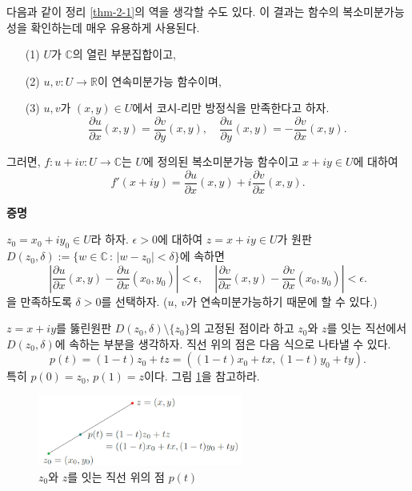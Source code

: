다음과 같이 정리 \ref{thm-2-1}의 역을 생각할 수도 있다.
이 결과는 함수의 복소미분가능성을 확인하는데 매우 유용하게 사용된다.

\par\smallskip
\par\smallskip
\par\smallskip

\begin{salttheorem}{}{} \label{thm-2-2}

\begin{itemize}
\item[(1)] $U$가 $\mathbb C$의 열린 부분집합이고,
\item[(2)] $u,v: U\to \mathbb R$이 연속미분가능 함수이며,
\item[(3)] $u,v$가 $(x,y)\in U$에서 코시-리만 방정식을 만족한다고 하자.
$$
\dfrac{\partial u}{\partial x}(x, y) = \dfrac{\partial v}{\partial y}(x, y),
\quad
\dfrac{\partial u}{\partial y}(x, y) = - \dfrac{\partial v}{\partial x}(x, y).
$$
\end{itemize}
그러면, $f:u+iv: U\to \mathbb C$는 $U$에 정의된 복소미분가능 함수이고
$x+iy\in U$에 대하여
$$
f'(x+iy) = \dfrac{\partial u}{\partial x}(x, y) + i \dfrac{\partial v}{\partial x}(x, y).
$$
\end{salttheorem}

{\bf 증명}

$z_0 = x_0 + iy_0 \in U$라 하자.
$\epsilon>0$에 대하여 
$z=x+iy\in U$가 원판 $D(z_0,\delta) := \{ w \in\mathbb C \,:\, |w-z_0| < \delta \}$에
속하면
\begin{equation}\label{eq-2-7}
\left| \dfrac{\partial u}{\partial x}(x,y) - \dfrac{\partial u}{\partial x}(x_0,y_0) \right| < \epsilon,
\quad
\left| \dfrac{\partial v}{\partial x}(x,y) - \dfrac{\partial v}{\partial x}(x_0,y_0) \right| < \epsilon.
\end{equation}
을 만족하도록 $\delta>0$를 선택하자.
($u$, $v$가 연속미분가능하기 때문에 할 수 있다.)

$z=x+iy$를 뚫린원판 $D(z_0,\delta)\setminus\{ z_0\}$의 고정된 점이라 하고
$z_0$와 $z$를 잇는 직선에서 $D(z_0,\delta)$에 속하는 부분을 생각하자.
직선 위의 점은 다음 식으로 나타낼 수 있다.
\[
p(t) = (1-t)z_0 + tz = \left( (1-t)x_0+tx, (1-t)y_0+ty \right).
\]
특히 $p(0)=z_0$, $p(1)=z$이다. 그림 \ref{fig-2-7}을 참고하라.

\begin{figure}[!h]
\begin{center}
\includegraphics[width=0.6\textwidth]{./SaltChapter/figs/fig-2-7}
\end{center}
\caption{$z_0$와 $z$를 잇는 직선 위의 점 $p(t)$}
\label{fig-2-7}
\end{figure}

